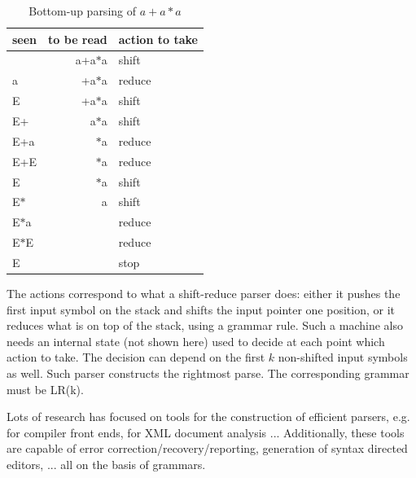 \begin{table}[ht]
\center
\begin{tabular}{|l|r|l|}
\hline
seen       & to be read      & action to take \\ \hline
           & a+a$*$a           & shift    \\
   a       &  +a$*$a           & reduce   \\
   E       &  +a$*$a           & shift    \\
   E+      &  a$*$a            & shift    \\
   E+a     &   $*$a            & reduce   \\
   E+E     &  $*$a             & reduce   \\
   E       &  $*$a             & shift    \\
   E$*$      &   a             & shift    \\
   E$*$a     &                 & reduce   \\
   E$*$E     &                 & reduce   \\
   E       &                 & stop   \\
\hline
\end{tabular}
\caption{Bottom-up parsing of $a+a*a$} \label{bottomup}
\end{table}
The actions correspond to what a shift-reduce parser does: either it
pushes the first input symbol on the stack and shifts the input
pointer one position, or it reduces what is on top of the stack, using
a grammar rule. Such a machine also needs an internal state (not shown
here) used to decide at each point which action to take. The decision
can depend on the first $k$ non-shifted input symbols as well. Such
parser constructs the rightmost parse. The corresponding grammar must
be LR(k).

Lots of research has focused on tools for the construction of
efficient parsers, e.g. for compiler front ends, for XML document
analysis ... Additionally, these tools are capable of error
correction/recovery/reporting, generation of syntax directed editors,
...  all on the basis of grammars.









